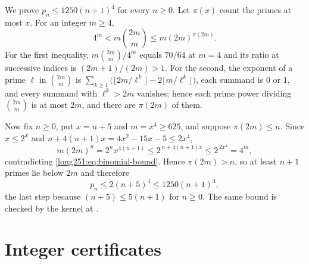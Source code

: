 We prove $p_n\le1250(n+1)^4$ for every $n\ge0$.  Let $\pi(x)$ count the primes
at most $x$.  For an integer $m\ge4$,
\begin{equation}\label{long251:eq:binomial-bound}
 4^m<m\binom{2m}{m}\le m(2m)^{\pi(2m)} .
\end{equation}
For the first inequality, $m\binom{2m}{m}/4^{m}$ equals $70/64$ at $m=4$ and
its ratio at successive indices is $(2m+1)/(2m)>1$.  For the second, the
exponent of a prime $\ell$ in $\binom{2m}{m}$ is
$\sum_{k\ge1}\bigl(\lfloor2m/\ell^{k}\rfloor-2\lfloor m/\ell^{k}\rfloor\bigr)$,
each summand is $0$ or $1$, and every summand with $\ell^{k}>2m$ vanishes;
hence each prime power dividing $\binom{2m}{m}$ is at most $2m$, and there are
$\pi(2m)$ of them.

Now fix $n\ge0$, put $x=n+5$ and $m=x^4\ge625$, and suppose $\pi(2m)\le n$.
Since $x\le2^{x}$ and $n+4(n+1)x=4x^2-15x-5\le2x^4$,
\[
 m(2m)^{n}=2^{n}x^{4(n+1)}
 \le2^{\,n+4(n+1)x}\le2^{\,2x^4}=4^{m},
\]
contradicting \eqref{long251:eq:binomial-bound}.  Hence $\pi(2m)>n$, so at least $n+1$
primes lie below $2m$ and therefore
\[
 p_n\le2(n+5)^4\le1250(n+1)^4 ,
\]
the last step because $(n+5)\le5(n+1)$ for $n\ge0$.  The same bound is checked
by the kernel at
.

\section{Integer certificates}\label{long251:app:certificates}

